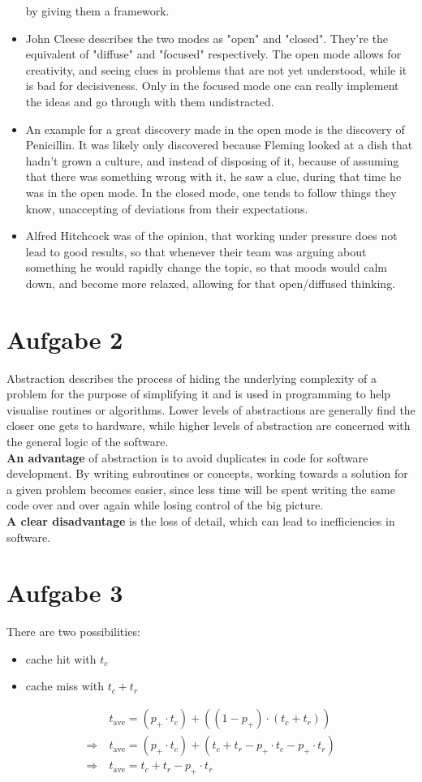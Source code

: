 \documentclass{article}
\begin{document}
\begin{itemize}
by giving them a framework.
\item
John Cleese describes the two modes as "open" and "closed". They're the
equivalent of "diffuse" and "focused" respectively. The open mode allows for
creativity, and seeing clues in problems that are not yet understood, while
it is bad for decisiveness. Only in the focused mode one can really implement
the ideas and go through with them undistracted.
\item An example for a great discovery made in the open mode is the discovery of
Penicillin. It was likely only discovered because Fleming looked at a dish
that hadn't grown a culture, and instead of disposing of it, because of assuming
that there was something wrong with it, he saw a clue, during that time he was
in the open mode. In the closed mode, one tends to follow things they know,
unaccepting of deviations from their expectations.
\item Alfred Hitchcock was of the opinion, that working under pressure does not lead
to good results, so that whenever their team was arguing about something he
would rapidly change the topic, so that moods would calm down, and become more
relaxed, allowing for that open/diffused thinking.
\end{itemize}
\section*{Aufgabe 2} 
Abstraction describes the process of hiding the underlying complexity
of a problem for the purpose of simplifying it and is used in programming
to help visualise routines or algorithms. Lower levels of abstractions
are generally find the closer one gets to hardware, while higher levels
of abstraction are concerned with the general logic of the software.\\
\textbf{An advantage} of abstraction is to avoid duplicates in code for
software development.
By writing subroutines or concepts, working towards a solution for a given
problem becomes easier, since less time will be spent writing the same code
over and over again while losing control of the big picture.\\
\textbf{A clear disadvantage} is the loss of detail, which can lead
to inefficiencies in software.
\section*{Aufgabe 3} 
There are two possibilities:
\begin{itemize}
    \item cache hit with \( t_c \)
    \item cache miss with \( t _{c} + t _{r }  \)
\end{itemize}
\begin{align*}
    &t _{\text{ave}} = (p _{+} \cdot t _{c} ) +
    \left( (1- p _{+} ) \cdot ( t_c + t_r) \right)\\
    \Rightarrow \ &t _{\text{ave}} = ( p _{+} \cdot t_c ) + ( t_c + t_r - p _{+}
    \cdot t_c - p _{+} \cdot t_r ) \\
    \Rightarrow \ &t _{\text{ave}} = t_c + t_r - p _{+} \cdot t_r 
\end{align*}
\end{document}
